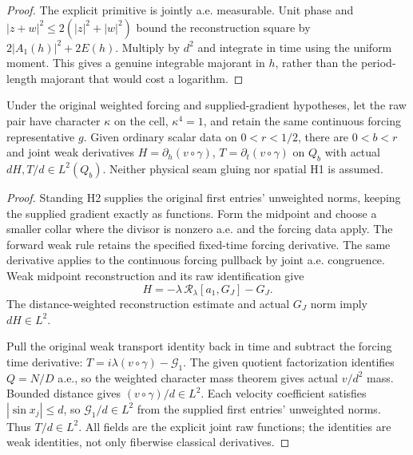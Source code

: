 \begin{proof}
\leanok
The explicit primitive is jointly a.e. measurable.
Unit phase and $|z+w|^2\le2(|z|^2+|w|^2)$ bound the reconstruction square by
$2|A_1(h)|^2+2E(h)$. Multiply by $d^2$ and integrate in time using the uniform
moment. This gives a genuine integrable majorant in $h$, rather than the
period-length majorant that would cost a logarithm.
\end{proof}

\begin{lemma}
\label{lem:weighted-character-base-derivatives}
\leanok
Under the original weighted forcing and supplied-gradient hypotheses,
let the raw pair have character $\kappa$ on the cell, $\kappa^4=1$, and retain
the same continuous forcing representative $g$.
Given ordinary scalar data on $0<r<1/2$, there are $0<b<r$ and joint weak
derivatives $H=\partial_h(v\circ\gamma)$, $T=\partial_t(v\circ\gamma)$ on $Q_b$
with actual $dH,T/d\in L^2(Q_b)$.
Neither physical seam gluing nor spatial H1 is assumed.
\end{lemma}

\begin{proof}
\leanok
Standing H2 supplies the original first entries' unweighted norms, keeping
the supplied gradient exactly as functions. Form the midpoint and choose
a smaller collar where the divisor is nonzero a.e. and the forcing data apply.
The forward weak rule retains the specified fixed-time forcing derivative.
The same derivative applies to the continuous forcing pullback by joint
a.e. congruence. Weak midpoint reconstruction and its raw identification give
\[
 H=-\lambda\,\mathcal R_\lambda[a_1,G_J]-G_J .
\]
The distance-weighted reconstruction estimate and actual $G_J$ norm imply
$dH\in L^2$.

Pull the original weak transport identity back in time and subtract the
forcing time derivative:
$T=i\lambda(v\circ\gamma)-\mathcal G_1$.
The given quotient factorization identifies $Q=N/D$ a.e., so the weighted
character mass theorem gives actual $v/d^2$ mass. Bounded distance gives
$(v\circ\gamma)/d\in L^2$. Each velocity coefficient satisfies $|\sin x_j|\le d$,
so $\mathcal G_1/d\in L^2$ from the supplied first entries' unweighted norms.
Thus $T/d\in L^2$. All fields are the explicit joint raw functions;
the identities are weak identities, not only fiberwise classical derivatives.
\end{proof}

